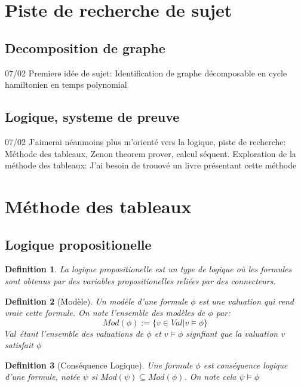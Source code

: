 \documentclass{paper}
\newtheorem{defi}{Definition}
\begin{document}
\setlength{\headheight}{13.07225pt}
\addtolength{\topmargin}{-1.07225pt}



\section*{Piste de recherche de sujet}
\subsection*{Decomposition de graphe}
07/02
Premiere idée de sujet: Identification de graphe décomposable en cycle hamiltonien en temps polynomial

\subsection*{Logique, systeme de preuve}
07/02
J'aimerai néanmoins plus m'orienté vers la logique, piste de recherche: Méthode des tableaux, Zenon theorem prover, calcul séquent.
Exploration de la méthode des tableaux: J'ai besoin de trouové un livre présentant cette méthode

\section{Méthode des tableaux}

\subsection{Logique propositionelle}
\begin{defi}
La \textit{logique propositionelle} est un type de logique où les formules sont obtenus par des variables propositionelles reliées par des connecteurs.
\end{defi}
\begin{defi}[Modèle]
    Un \textit{modèle} d'une formule $\phi$ est une valuation qui rend vraie cette formule. On note l'ensemble des modèles de $\phi$ par:
    $$Mod(\phi) := \{v\in Val | v \vDash \phi\}$$
    $Val$ étant l'ensemble des valuations de $\phi$ et $v \vDash \phi$ signfiant que la valuation $v$ satisfait $\phi$
\end{defi}
\begin{defi}[Conséquence Logique]
    Une formule $\phi$ est \textit{conséquence logique} d'une formule, notée $\psi$ si $Mod(\psi) \subseteq Mod(\phi)$. On note cela $\psi \vDash \phi$
\end{defi}
\end{document}

